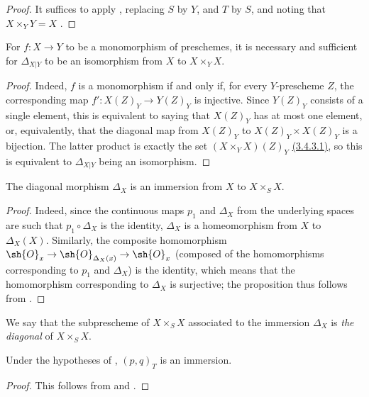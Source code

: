 \begin{proof}
It suffices to apply , replacing $S$ by $Y$, and $T$ by $S$, and noting that $X\times_Y Y=X$ .
\end{proof}

\begin{proposition}[5.3.8]
\label{I.5.3.8}
For $f:X\to Y$ to be a monomorphism of preschemes, it is necessary and sufficient for $\Delta_{X|Y}$ to be an isomorphism from $X$ to $X\times_Y X$.
\end{proposition}

\begin{proof}
Indeed, $f$ is a monomorphism if and only if, for every $Y$-prescheme $Z$, the corresponding map $f':X(Z)_Y\to Y(Z)_Y$ is injective.
Since $Y(Z)_Y$ consists of a single element, this is equivalent to saying that $X(Z)_Y$ has at most one element, or, equivalently, that the diagonal map from $X(Z)_Y$ to $X(Z)_Y\times X(Z)_Y$ is a bijection.
The latter product is exactly the set $(X\times_Y X)(Z)_Y$ \hyperref[I.3.4.3]{(3.4.3.1)}, so this is equivalent to $\Delta_{X|Y}$ being an isomorphism.
\end{proof}

\begin{proposition}[5.3.9]
\label{I.5.3.9}
The diagonal morphism $\Delta_X$ is an immersion from $X$ to $X\times_S X$.
\end{proposition}

\begin{proof}
Indeed, since the continuous maps $p_1$ and $\Delta_X$ from the underlying spaces are such that $p_1\circ\Delta_X$ is the identity, $\Delta_X$ is a homeomorphism from $X$ to $\Delta_X(X)$.
Similarly, the composite homomorphism $\sh{O}_x\to\sh{O}_{\Delta_X(x)}\to\sh{O}_x$ (composed of the homomorphisms corresponding to $p_1$ and $\Delta_X$) is the identity, which means that the homomorphism corresponding to $\Delta_X$ is surjective;
the proposition thus follows from .
\end{proof}

We say that the subprescheme of $X\times_S X$ associated to the immersion $\Delta_X$  is \emph{the diagonal} of $X\times_S X$.

\begin{corollary}[5.3.10]
\label{I.5.3.10}
Under the hypotheses of , $(p,q)_T$ is an immersion.
\end{corollary}

\begin{proof}
This follows from  and .
\end{proof}

